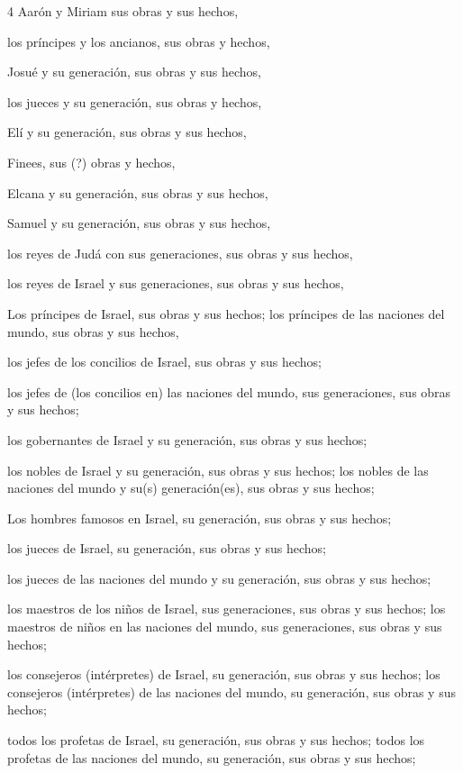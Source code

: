 \par 4 Aarón y Miriam sus obras y sus hechos,
\par los príncipes y los ancianos, sus obras y hechos,
\par Josué y su generación, sus obras y sus hechos,
\par los jueces y su generación, sus obras y hechos,
\par Elí y su generación, sus obras y sus hechos,
\par Finees, sus (?) obras y hechos,
\par Elcana y su generación, sus obras y sus hechos,
\par Samuel y su generación, sus obras y sus hechos,
\par los reyes de Judá con sus generaciones, sus obras y sus hechos,
\par los reyes de Israel y sus generaciones, sus obras y sus hechos,
\par Los príncipes de Israel, sus obras y sus hechos; los príncipes de las naciones del mundo, sus obras y sus hechos,
\par los jefes de los concilios de Israel, sus obras y sus hechos;
\par los jefes de (los concilios en) las naciones del mundo, sus generaciones, sus obras y sus hechos;
\par los gobernantes de Israel y su generación, sus obras y sus hechos;
\par los nobles de Israel y su generación, sus obras y sus hechos; los nobles de las naciones del mundo y su(s) generación(es), sus obras y sus hechos;
\par Los hombres famosos en Israel, su generación, sus obras y sus hechos;
\par los jueces de Israel, su generación, sus obras y sus hechos;
\par los jueces de las naciones del mundo y su generación, sus obras y sus hechos;
\par los maestros de los niños de Israel, sus generaciones, sus obras y sus hechos; los maestros de niños en las naciones del mundo, sus generaciones, sus obras y sus hechos;
\par los consejeros (intérpretes) de Israel, su generación, sus obras y sus hechos; los consejeros (intérpretes) de las naciones del mundo, su generación, sus obras y sus hechos;
\par todos los profetas de Israel, su generación, sus obras y sus hechos; todos los profetas de las naciones del mundo, su generación, sus obras y sus hechos;

